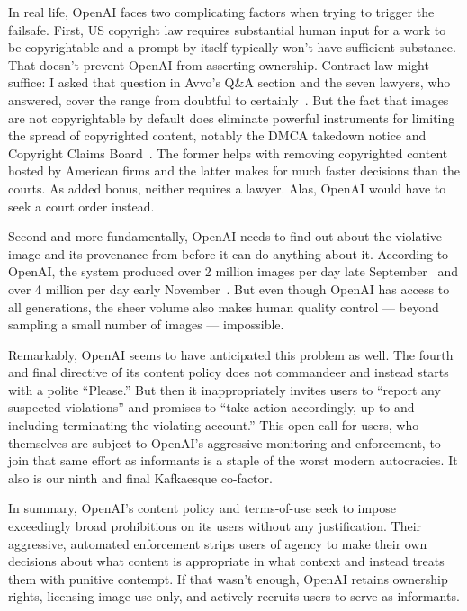 In real life, OpenAI faces two complicating factors when trying to trigger the
failsafe. First, US copyright law requires substantial human input for a work to
be copyrightable and a prompt by itself typically won't have sufficient
substance. That doesn't prevent OpenAI from asserting ownership. Contract law
might suffice: I asked that question in Avvo's Q\&A section and the seven
lawyers, who answered, cover the range from doubtful to
certainly~\cite{Grimm2023}. But the fact that images are not copyrightable by
default does eliminate powerful instruments for limiting the spread of
copyrighted content, notably the DMCA takedown notice and Copyright Claims
Board~\cite{CCB2022}. The former helps with removing copyrighted content hosted
by American firms and the latter makes for much faster decisions than the
courts. As added bonus, neither requires a lawyer. Alas, OpenAI would have to
seek a court order instead.

Second and more fundamentally, OpenAI needs to find out about the violative
image and its provenance from \DALLE before it can do anything about it.
According to OpenAI, the system produced over 2 million images per day late
September~\cite{OpenAI2022a} and over 4 million per day early
November~\cite{OpenAI2022h}. But even though OpenAI has access to all
generations, the sheer volume also makes human quality control --- beyond
sampling a small number of images --- impossible.

Remarkably, OpenAI seems to have anticipated this problem as well. The fourth
and final directive of its content policy does not commandeer and instead starts
with a polite “Please.” But then it inappropriately invites users to “report any
suspected violations” and promises to “take action accordingly, up to and
including terminating the violating account.” This open call for users, who
themselves are subject to OpenAI's aggressive monitoring and enforcement, to
join that same effort as informants is a staple of the worst modern autocracies.
It also is our ninth and final Kafkaesque co-factor.

In summary, OpenAI's content policy and terms-of-use seek to impose exceedingly
broad prohibitions on its users without any justification. Their aggressive,
automated enforcement strips users of agency to make their own decisions about
what content is appropriate in what context and instead treats them with
punitive contempt. If that wasn't enough, OpenAI retains ownership rights,
licensing image use only, and actively recruits users to serve as informants.

